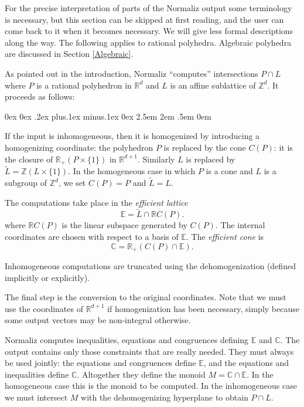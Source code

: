 \documentclass[12pt,a4paper]{scrartcl}
\newcounter{listi}
\newcommand{\stdli}{ \topsep0ex \partopsep0ex %
\parsep.2ex plus.1ex minus.1ex \itemsep0ex%
\leftmargin2.5em \labelwidth2em \labelsep.5em \rightmargin0em}%
\newenvironment{arab}{\begin{list}{\textup{(\arabic{listi})}}%
	{\usecounter{listi}\stdli}}{\end{list}}
\theoremstyle{definition}
\def\CC{{\mathbb C}}
\def\ZZ{{\mathbb Z}}
\def\RR{{\mathbb R}}
\def\EE{{\mathbb E}}
\begin{document}
For the precise interpretation of parts of the Normaliz output some terminology is necessary, but this section can be skipped at first reading, and the user can come back to it when it becomes necessary. We will give less formal descriptions along the way. The following applies to rational polyhedra. Algebraic polyhedra are discussed in Section \ref{Algebraic}.

As pointed out in the introduction, Normaliz ``computes'' intersections $P\cap L$ where $P$ is a rational polyhedron in $\RR^d$ and $L$ is an affine sublattice of $\ZZ^d$. It proceeds as follows:

\begin{arab}
	\item If the input is inhomogeneous, then it is homogenized by introducing a homogenizing coordinate: the polyhedron $P$ is replaced by the cone $C(P)$: it is the closure of $\RR_+(P\times \{1\})$ in $\RR^{d+1}$. Similarly $L$ is replaced by $\widetilde L=\ZZ(L\times \{1\})$. In the homogeneous case in which $P$ is a cone and $L$ is a subgroup of $\ZZ^d$, we set $C(P)=P$ and $\widetilde L=L$.
	
	\item The computations take place in the \emph{efficient lattice} 
	$$
	\EE=\widetilde{L}\cap \RR C(P).
	$$
	where $\RR C(P)$ is the linear subspace generated by $C(P)$. The internal coordinates are chosen with respect to a basis of $\EE$. The \emph{efficient cone} is
	$$
	\CC=\RR_+(C(P)\cap \EE).
	$$
	
	\item Inhomogeneous computations are truncated using the dehomogenization (defined implicitly or explicitly).
	
	\item The final step is the conversion to the original coordinates. Note that we must use the coordinates of $\RR^{d+1}$ if homogenization has been necessary, simply because some output vectors may be non-integral otherwise.
\end{arab}

Normaliz computes inequalities, equations and congruences defining $\EE$ and $\CC$. The output contains only those constraints that are really needed. They must always be used jointly: the equations and congruences define $\EE$, and the equations and inequalities define $\CC$. Altogether they define the monoid $M=\CC\cap\EE$. In the homogeneous case this is the monoid to be computed. In the inhomogeneous case we must intersect $M$ with the dehomogenizing hyperplane to obtain $P\cap L$.
\end{document}
